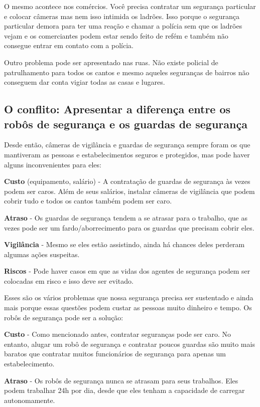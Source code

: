 \documentclass[12pt,a4paper]{article}
\begin{document}
    O mesmo acontece nos comércios. Você precisa contratar um segurança particular e colocar câmeras mas nem isso intimida os ladrões. Isso porque o segurança particular demora para ter uma reação e chamar a polícia sem que os ladrões vejam e os comerciantes podem estar sendo feito de refém e também não consegue entrar em contato com a polícia.

    Outro problema pode ser apresentado nas ruas. Não existe policial de patrulhamento para todos os cantos e mesmo aqueles seguranças de bairros não conseguem dar conta vigiar todas as casas e lugares. 

    \subsection{O conflito: Apresentar a diferença entre os robôs de segurança e os guardas de segurança}
    Desde então, câmeras de vigilância e guardas de segurança sempre foram os que mantiveram as pessoas e estabelecimentos seguros e protegidos, mas pode haver alguns inconvenientes para eles: 

    \textbf{Custo} (equipamento, salário) - A contratação de guardas de segurança às vezes podem ser caros. Além de seus salários, instalar câmeras de vigilância que podem cobrir tudo e todos os cantos também podem ser caro.

    \textbf{Atraso} - Os guardas de segurança tendem a se atrasar para o trabalho, que as vezes pode ser um fardo/aborrecimento para os guardas que precisam cobrir eles.

    \textbf{Vigilância} - Mesmo se eles estão assistindo, ainda há chances deles perderam algumas ações suspeitas.

    \textbf{Riscos} - Pode haver casos em que as vidas dos agentes de segurança podem ser colocadas em risco e isso deve ser evitado.

    Esses são os vários problemas que nossa segurança precisa ser sustentado e ainda mais porque essas questões podem custar as pessoas muito dinheiro e tempo. Os robôs de segurança pode ser a solução:

    \textbf{Custo} - Como mencionado antes, contratar seguranças pode ser caro. No entanto, alugar um robô de segurança e contratar poucos guardas são muito mais baratos que contratar muitos funcionários de segurança para apenas um estabelecimento.

    \textbf{Atraso} - Os robôs de segurança nunca se atrasam para seus trabalhos. Eles podem trabalhar 24h por dia, desde que eles tenham a capacidade de carregar autonomamente.
\end{document}
